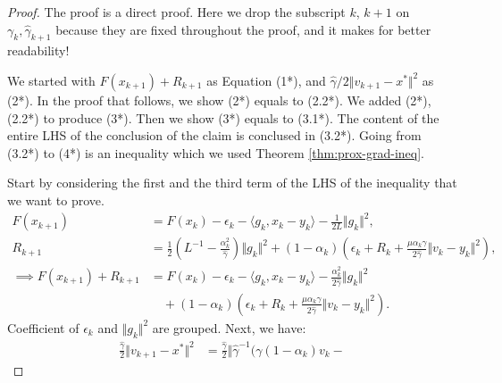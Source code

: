 \documentclass[12pt]{article}
\begin{document}
    \begin{proof}
        The proof is a direct proof. 
        Here we drop the subscript $k$, $k + 1$ on $\gamma_{k}, \hat \gamma_{k + 1}$ because they are fixed throughout the proof, and it makes for better readability! 
        \par 
        We started with $F(x_{k + 1}) + R_{k + 1}$ as Equation (1*), and $\hat \gamma/2\Vert v_{k + 1} - x^*\Vert^2$ as (2*). 
        In the proof that follows, we show (2*) equals to (2.2*). 
        We added (2*), (2.2*) to produce (3*). 
        Then we show (3*) equals to (3.1*). 
        The content of the entire LHS of the conclusion of the claim is conclused in (3.2*). 
        Going from (3.2*) to (4*) is an inequality which we used Theorem \ref{thm:prox-grad-ineq}. 
        \par
        Start by considering the first and the third term of the LHS of the inequality that we want to prove. 
        \begin{align*}
            F(x_{k + 1}) &= 
            F(x_k) - \epsilon_k - \langle  g_k, x_k - y_k\rangle - \frac{1}{2L}\Vert g_k\Vert^2, 
            \\
            R_{k + 1}
            &= 
            \frac{1}{2}\left(
                L^{-1} - \frac{\alpha_k^2}{\hat \gamma}
            \right)\Vert g_k\Vert^2
            + 
            (1 - \alpha_k)
            \left(
                \epsilon_k + R_k + 
                \frac{\mu\alpha_k\gamma}{2\hat \gamma}
                \Vert v_k - y_k\Vert^2
            \right), 
            \\
            \implies 
            F(x_{k + 1}) + R_{k + 1}
            &= 
            F(x_k) - \epsilon_k - \langle  g_k, x_k - y_k\rangle
            - \frac{\alpha_k^2}{2\hat \gamma}\Vert g_k\Vert^2
            \\
            &\quad 
                + 
                (1 - \alpha_k)
                \left(
                    \epsilon_k + R_k + 
                    \frac{\mu\alpha_k\gamma}{2\hat \gamma}
                    \Vert v_k - y_k\Vert^2
                \right). 
        \tag{1*}
        \end{align*}
        Coefficient of $\epsilon_k$ and $\Vert g_k\Vert^2$ are grouped. 
        Next, we have: 
        \begin{align*}
            \frac{\hat \gamma}{2}\Vert v_{k + 1} - x^* \Vert^2
            &= 
            \frac{\hat \gamma}{2}\Vert 
                \hat \gamma^{-1}
                (
                    \gamma(1 - \alpha_k)v_k - 

\end{align*}
\end{proof}
\end{document}
